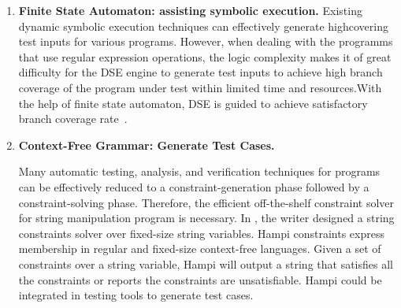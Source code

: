 \documentclass[times, 10pt,onecolumn]{article}
\begin{document}
\begin{enumerate}
\item{\textbf{Finite State Automaton: assisting symbolic execution.} }
Existing dynamic symbolic execution techniques can effectively generate highcovering
test inputs for various programs. However, when dealing with the programms that use regular expression operations, the logic complexity makes it of  great difficulty for the DSE engine to generate test inputs to achieve high branch coverage of the program under test within limited time and resources.With the help of finite state automaton, DSE is guided to achieve satisfactory branch coverage rate~\cite{reggae}.

\item{\textbf{Context-Free Grammar: Generate Test Cases.} }

Many automatic testing, analysis, and verification techniques for
programs can be effectively reduced to a constraint-generation
phase followed by a constraint-solving phase. Therefore, the efficient off-the-shelf constraint solver for string manipulation program is necessary. In \cite{hampi}, the writer designed a string constraints solver over fixed-size string variables. Hampi constraints express membership in regular and fixed-size context-free languages. Given a set of constraints over a string variable, Hampi will output a string that satisfies all the constraints or reports the constraints are unsatisfiable. Hampi could be integrated in testing tools to generate test cases. 




\end{enumerate}
\end{document}
